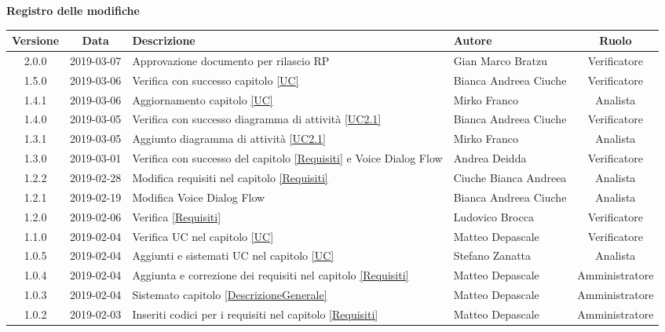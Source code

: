 	\begin{center}
		\textbf{Registro delle modifiche}
	\end{center}
	\begin{center}
		\begin{tabularx}{\textwidth}{|c|c|X|X|c|}
			\hline
			\textbf{Versione} & \textbf{Data} & \textbf{Descrizione} & \textbf{Autore} & \textbf{Ruolo} \\
			\hline
			2.0.0 & 2019-03-07 & Approvazione documento per rilascio RP & Gian Marco Bratzu & Verificatore \\
			\hline
			1.5.0 & 2019-03-06 & Verifica con successo capitolo \ref{UC} & Bianca Andreea Ciuche & Verificatore \\
			\hline
			1.4.1 & 2019-03-06 & Aggiornamento capitolo \ref{UC} & Mirko Franco & Analista \\
			\hline
			1.4.0 & 2019-03-05 & Verifica con successo diagramma di attività \ref{UC2.1} & Bianca Andreea Ciuche & Verificatore \\
			\hline
			1.3.1 & 2019-03-05 & Aggiunto diagramma di attività \ref{UC2.1} & Mirko Franco & Analista \\
			\hline
			1.3.0 & 2019-03-01 & Verifica con successo del capitolo \ref{Requisiti} e Voice Dialog Flow& Andrea Deidda & Verificatore \\
			\hline
			1.2.2 & 2019-02-28 & Modifica requisiti nel capitolo \ref{Requisiti}& Ciuche Bianca Andreea & Analista \\
			\hline
			1.2.1 & 2019-02-19 & Modifica Voice Dialog Flow & Bianca Andreea Ciuche & Analista  \\
			\hline
			1.2.0 & 2019-02-06 & Verifica \ref{Requisiti}& Ludovico Brocca & Verificatore \\
			\hline
			1.1.0 & 2019-02-04 & Verifica UC nel capitolo \ref{UC}& Matteo Depascale & Verificatore\\
			\hline
			1.0.5 & 2019-02-04 & Aggiunti e sistemati UC nel capitolo \ref{UC}& Stefano Zanatta & Analista\\
			\hline
			1.0.4 & 2019-02-04 & Aggiunta e correzione dei requisiti nel capitolo \ref{Requisiti}& Matteo Depascale & Amministratore\\
			\hline
			1.0.3 & 2019-02-04 & Sistemato capitolo \ref{DescrizioneGenerale}& Matteo Depascale & Amministratore\\
			\hline
			1.0.2 & 2019-02-03 & Inseriti codici per i requisiti nel capitolo \ref{Requisiti}& Matteo Depascale & Amministratore\\

\end{tabularx}
\end{center}
